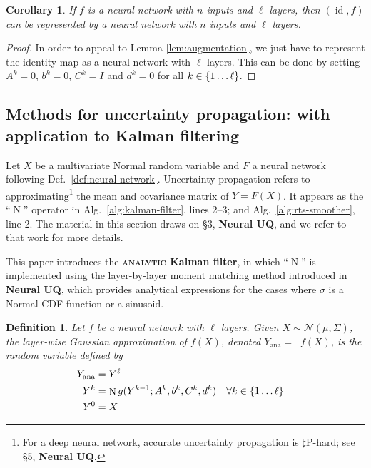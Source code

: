 \documentclass{article} %
\newcommand{\neuralUQ}{{\color{red} \textbf{Neural UQ}}\xspace}
\newtheorem{definition}{Definition}
\newtheorem{corollary}{Corollary}
\DeclareMathOperator{\normal}{\mathrm N}
\DeclareMathOperator{\Normal}{\mathrm N^*}
\begin{document}
\begin{corollary}
  If \(f\) is a neural network with \(n\) inputs and \(\ell\) layers,
  then \((\operatorname{id}, f)\) can be represented by a neural network with \(n\)
  inputs and \(\ell\) layers.
\end{corollary}
\begin{proof}
  In order to appeal to Lemma \ref{lem:augmentation}, we just have to represent the identity map as a neural network with \(\ell\) layers.
  This can be done by setting \(A^k = 0\), \(b^k = 0\), \(C^k = I\) and \(d^k = 0\) for all \(k \in \cbr{1 \ldots \ell}\).
\end{proof}

\subsection{Methods for uncertainty propagation: with application to Kalman filtering}
Let \(X\) be a multivariate Normal random variable and \(F\) a neural network following Def.~\ref{def:neural-network}.
Uncertainty propagation refers to approximating\footnote{For a deep neural network, accurate uncertainty propagation is \(\sharp\)P-hard; see \S5, \neuralUQ.} the mean and covariance matrix of \(Y = F(X)\).
It appears as the ``\(\normal\)'' operator in Alg.~\ref{alg:kalman-filter}, lines 2--3; and Alg.~\ref{alg:rts-smoother}, line 2.
The material in this section draws on \S3, \neuralUQ, and we refer to that work for more details.

This paper introduces the \textbf{\textsc{analytic} Kalman filter}, in which ``\(\normal\)'' is implemented using the layer-by-layer moment matching method introduced in \neuralUQ, which provides analytical expressions for the cases where \(\sigma\) is a Normal CDF function or a sinusoid.
\begin{definition}
    Let \(f\) be a neural network with \(\ell\) layers.
    Given \(X \sim \mathcal N(\mu, \Sigma)\), the layer-wise Gaussian approximation of \(f(X)\), denoted \(Y_\mathrm{ana} = \Normal f(X)\), is the random variable defined by
    \begin{align*}
        Y_\mathrm{ana} &=  Y^\ell\\
        Y^k &= \normal g(Y^{k-1}; A^k, b^k, C^k, d^k) & \forall k &\in \cbr{1 \ldots \ell} \\
        Y^0 &= X
    \end{align*}
\end{definition}
\end{document}

